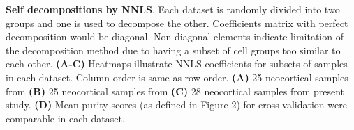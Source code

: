 \textbf{Self decompositions by NNLS}.
 Each dataset is randomly divided into two groups and one is used to decompose the other. Coefficients matrix with perfect decomposition would be diagonal. Non-diagonal elements indicate limitation of the decomposition method due to having a subset of cell groups too similar to each other. \textbf{(A-C)} Heatmaps illustrate NNLS coefficients for subsets of samples in each dataset. Column order is same as row order. \textbf{(A)} 25 neocortical samples from \cite{Tasic_2018} \textbf{(B)} 25 neocortical samples from \cite{Zeisel_2018} \textbf{(C)} 28 neocortical samples from present study. \textbf{(D)} Mean purity scores (as defined in Figure 2) for cross-validation were comparable in each dataset.
 
